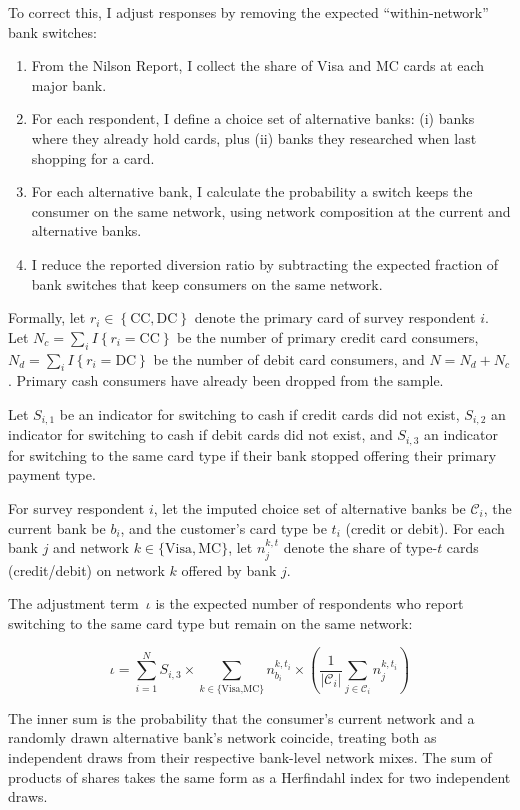 \documentclass[main.tex]{subfiles}
\begin{document}
To correct this, I adjust responses by removing the expected ``within-network'' bank switches:

\begin{enumerate}
    \item From the Nilson Report, I collect the share of Visa and MC cards at each major bank.
    \item For each respondent, I define a choice set of alternative banks: (i) banks where they already hold cards, plus (ii) banks they researched when last shopping for a card.
    \item For each alternative bank, I calculate the probability a switch keeps the consumer on the same network, using network composition at the current and alternative banks.
    \item I reduce the reported diversion ratio by subtracting the expected fraction of bank switches that keep consumers on the same network.
\end{enumerate}

Formally, let $r_{i}\in\left\{ \text{CC},\text{DC}\right\}$ denote the primary card of survey respondent $i$.
Let $N_{c}=\sum_{i}I\left\{ r_{i}=\text{CC}\right\}$ be the number of primary credit card consumers, $N_{d}=\sum_{i}I\left\{ r_{i}=\text{DC}\right\}$ be the number of debit card consumers, and $N=N_d + N_c$.
Primary cash consumers have already been dropped from the sample.

Let $S_{i,1}$ be an indicator for switching to cash if credit cards did not exist, $S_{i,2}$ an indicator for switching to cash if debit cards did not exist, and $S_{i,3}$ an indicator for switching to the same card type if their bank stopped offering their primary payment type.

For survey respondent $i$, let the imputed choice set of alternative banks be $\mathcal{C}_i$, the current bank be $b_i$, and the customer's card type be $t_i$ (credit or debit).
For each bank $j$ and network $k \in \{\text{Visa}, \text{MC}\}$, let $n_{j}^{k,t}$ denote the share of type-$t$ cards (credit/debit) on network $k$ offered by bank $j$.

The adjustment term~$\iota$ is the expected number of respondents who report switching to the same card type but remain on the same network:

\[
\iota = \sum_{i=1}^{N}S_{i,3}\times\sum_{k\in\{\text{Visa,MC}\}}n_{b_{i}}^{k,t_{i}}\times\left(\frac{1}{|\mathcal{C}_{i}|}\sum_{j\in\mathcal{C}_{i}}n_{j}^{k,t_{i}}\right)
\]

The inner sum is the probability that the consumer's current network and a randomly drawn alternative bank's network coincide, treating both as independent draws from their respective bank-level network mixes. The sum of products of shares takes the same form as a Herfindahl index for two independent draws.
\end{document}

